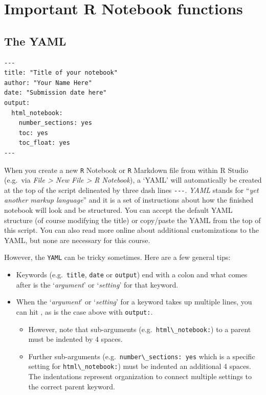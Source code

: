 \documentclass[
]{book}
\newcommand{\passthrough}[1]{#1}
\providecommand{\tightlist}{%
  \setlength{\itemsep}{0pt}\setlength{\parskip}{0pt}}
\begin{document}
\hypertarget{important-r-notebook-functions}{%
\section*{Important R Notebook functions}\label{important-r-notebook-functions}}

\hypertarget{the-yaml}{%
\subsection*{The YAML}\label{the-yaml}}

\begin{lstlisting}
---
title: "Title of your notebook"
author: "Your Name Here"
date: "Submission date here"
output:
  html_notebook:
    number_sections: yes
    toc: yes
    toc_float: yes
---
\end{lstlisting}

When you create a new \passthrough{\lstinline!R!} Notebook or \passthrough{\lstinline!R!} Markdown file from within R Studio (e.g.~via \emph{File \textgreater{} New File \textgreater{} R Notebook}), a `YAML' will automatically be created at the top of the script delineated by three dash lines \passthrough{\lstinline!---!}. \emph{YAML} stands for ``\emph{yet another markup language}'' and it is a set of instructions about how the finished notebook will look and be structured. You can accept the default YAML structure (of course modifying the title) or copy/paste the YAML from the top of this script. You can also read more online about additional customizations to the YAML, but none are necessary for this course.

However, the \passthrough{\lstinline!YAML!} can be tricky sometimes. Here are a few general tips:

\begin{itemize}
\tightlist
\item
  Keywords (e.g.~\passthrough{\lstinline!title!}, \passthrough{\lstinline!date!} or \passthrough{\lstinline!output!}) end with a colon and what comes after is the `\emph{argument}' or `\emph{setting}' for that keyword.\\
\item
  When the `\emph{argument}' or `\emph{setting}' for a keyword takes up multiple lines, you can hit \emph{}, as is the case above with \passthrough{\lstinline!output:!}.

  \begin{itemize}
  \tightlist
  \item
    However, note that sub-arguments (e.g.~\passthrough{\lstinline!html\_notebook:!}) to a parent must be indented by 4 spaces.
  \item
    Further sub-arguments (e.g.~\passthrough{\lstinline!number\_sections: yes!} which is a specific setting for \passthrough{\lstinline!html\_notebook:!}) must be indented an additional 4 spaces. The indentations represent organization to connect multiple settings to the correct parent keyword.
  \end{itemize}
\end{itemize}
\end{document}
